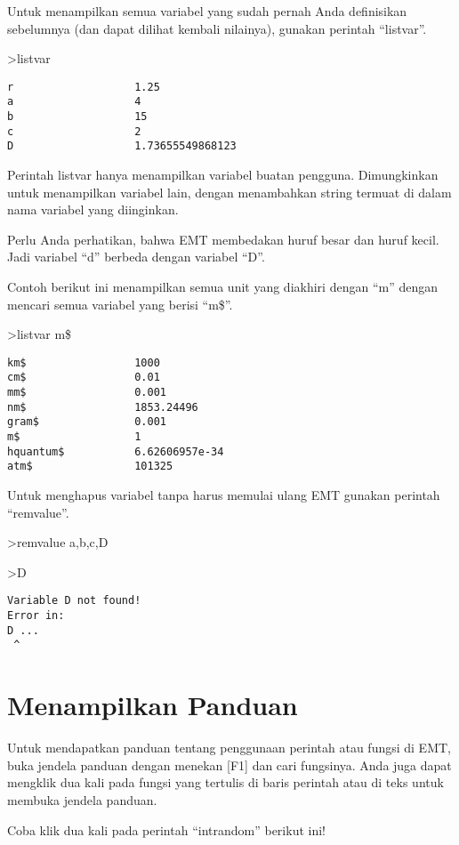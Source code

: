\documentclass[
]{book}
\begin{document}
Untuk menampilkan semua variabel yang sudah pernah Anda definisikan sebelumnya (dan dapat dilihat kembali nilainya), gunakan perintah ``listvar''.

\textgreater listvar

\begin{verbatim}
r                   1.25
a                   4
b                   15
c                   2
D                   1.73655549868123
\end{verbatim}

Perintah listvar hanya menampilkan variabel buatan pengguna. Dimungkinkan untuk menampilkan variabel lain, dengan menambahkan string termuat di dalam nama variabel yang diinginkan.

Perlu Anda perhatikan, bahwa EMT membedakan huruf besar dan huruf kecil. Jadi variabel ``d'' berbeda dengan variabel ``D''.

Contoh berikut ini menampilkan semua unit yang diakhiri dengan ``m'' dengan mencari semua variabel yang berisi ``m\$''.

\textgreater listvar m\$

\begin{verbatim}
km$                 1000
cm$                 0.01
mm$                 0.001
nm$                 1853.24496
gram$               0.001
m$                  1
hquantum$           6.62606957e-34
atm$                101325
\end{verbatim}

Untuk menghapus variabel tanpa harus memulai ulang EMT gunakan perintah ``remvalue''.

\textgreater remvalue a,b,c,D

\textgreater D

\begin{verbatim}
Variable D not found!
Error in:
D ...
 ^
\end{verbatim}

\chapter{Menampilkan Panduan}\label{menampilkan-panduan}

Untuk mendapatkan panduan tentang penggunaan perintah atau fungsi di EMT, buka jendela panduan dengan menekan {[}F1{]} dan cari fungsinya. Anda juga dapat mengklik dua kali pada fungsi yang tertulis di baris perintah atau di teks untuk membuka jendela panduan.

Coba klik dua kali pada perintah ``intrandom'' berikut ini!
\end{document}
